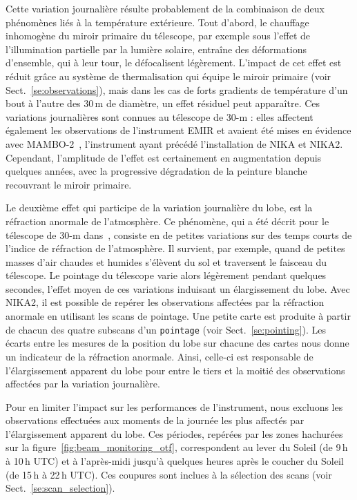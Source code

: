 Cette variation journalière résulte probablement de la combinaison de
deux phénomènes liés à la température extérieure. Tout d'abord, le
chauffage inhomogène du miroir primaire du télescope, par exemple sous
l'effet de l'illumination partielle par la lumière solaire, entraîne
des déformations d'ensemble, qui à leur tour, le défocalisent
légèrement. L'impact de cet effet est réduit grâce au système de
thermalisation qui équipe le miroir primaire (voir
Sect.~\ref{se:observations}), mais dans les cas de forts gradients de
température d'un bout à l'autre des 30\,m de diamètre, un effet
résiduel peut apparaître. Ces variations journalières sont connues au
télescope de 30-m : elles affectent également les observations de
l'instrument EMIR et avaient été mises en évidence avec
MAMBO-2~\citep{Kreysa1999}, l'instrument ayant précédé l'installation
de NIKA et NIKA2. Cependant, l'amplitude de l'effet est certainement
en augmentation depuis quelques années, avec la progressive
dégradation de la peinture blanche recouvrant le miroir primaire.

Le deuxième effet qui participe de la variation journalière du lobe,
est la réfraction anormale de l'atmosphère. Ce phénomène, qui a été
décrit pour le télescope de 30-m dans~\citet{Altenhoff1987}, consiste
en de petites variations sur des temps courts de l'indice de
réfraction de l'atmosphère. Il survient, par exemple, quand de petites
masses d'air chaudes et humides s'élèvent du sol et traversent le
faisceau du télescope. Le pointage du télescope varie alors légèrement
pendant quelques secondes, l'effet moyen de ces variations induisant
un élargissement du lobe. Avec NIKA2, il est possible de repérer les
observations affectées par la réfraction anormale en utilisant les
scans de pointage. Une petite carte est produite à partir de chacun
des quatre subscans d'un {\tt pointage} (voir
Sect.~\ref{se:pointing}). Les écarts entre les mesures de la
position du lobe sur chacune des cartes nous donne un indicateur de
la réfraction anormale. Ainsi, celle-ci est responsable de
l'élargissement apparent du lobe pour entre le tiers et la moitié des
observations affectées par la variation journalière.  


Pour en limiter l'impact sur les performances de l'instrument, nous
excluons les observations effectuées aux moments de la journée les
plus affectés par l'élargissement apparent du lobe. Ces périodes,
repérées par les zones hachurées sur la
figure~\ref{fig:beam_monitoring_otf}, correspondent au lever du Soleil
(de 9\,h à 10\,h UTC) et à l'après-midi jusqu'à quelques heures après
le coucher du Soleil (de 15\,h à 22\,h UTC). Ces coupures sont inclues
à la sélection des scans (voir Sect.~\ref{se:scan_selection}).




